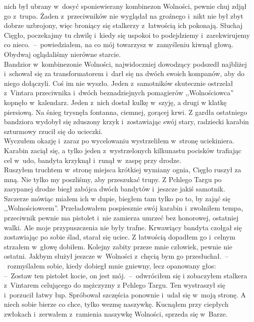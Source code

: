 \documentclass[../MAIN.tex]{subfiles}
\begin{document}
nich był ubrany w~dosyć sponiewierany kombinezon Wolności,
pewnie chuj zdjął go z~trupa. Żaden z~przeciwników nie
wyglądał na groźnego i~nikt nie był zbyt dobrze uzbrojony, więc
broniący się stalkerzy z~łatwością ich pokonają.
\sd
\xx Słuchaj Cięgło, poczekajmy tu chwilę i~kiedy się uspokoi to
podejdziemy i~zarekwirujemy co nieco.~--~powiedziałem, na co
mój towarzysz w~zamyśleniu kiwnął głową.
\qd
Obydwaj oglądaliśmy nierówne starcie.\\
Bandzior w~kombinezonie Wolności, najwidoczniej dowodzący
podszedł najbliżej i~schował się za transformatorem i~darł się
na dwóch swoich kompanów, aby do niego dołączyli. Coś im nie
wyszło. Jeden z~samotników skutecznie ostrzelał z~Vintara
przeciwnika i~dwóch beznadziejnych pomagierów ,,Wolnościowca''
kopnęło w~kalendarz. Jeden z~nich dostał kulkę w~szyję, a drugi
w klatkę piersiową. Na śnieg trysnęła fontanna, ciemnej,
gorącej krwi. Z gardła ostatniego bandziora wydobył się
zduszony krzyk i~zostawiając swój stary, radziecki karabin
szturmowy rzucił się do ucieczki.
\\
Wyczułem okazję i~zaraz po
wycelowaniu wystrzeliłem w~stronę uciekiniera. Karabin zaciął
się, a tylko jeden z~wystrzelonych kilkunastu pocisków
trafiając cel w~udo, bandyta krzyknął i~runął w~zaspę przy
drodze.
\\
Ruszyłem truchtem w~stronę miejsca krótkiej wymiany ognia,
Cięgło ruszył za mną. Nie tylko my poszliśmy, aby przeszukać
trupy. Z Pchlego Targu po zasypanej drodze biegł zabójca dwóch
bandytów i~jeszcze jakiś samotnik. Szczerze mówiąc miałem ich w
dupie, biegłem tam tylko po to, by zająć się ,,Wolnościowcem''.
Przeładowałem pospiesznie swój karabin i~zwolniłem tempa,
przeciwnik pewnie ma pistolet i~nie zamierza umrzeć bez
honorowej, ostatniej walki. Ale moje przypuszczenia nie były
trafne. Krwawiący bandyta czołgał się zostawiając po sobie
ślad, starał się uciec. Z łatwością dopadłem go i~celnym
strzałem w~głowę dobiłem. Kolejny zabity przeze mnie człowiek,
pewnie nie ostatni. Jakbym służył jeszcze w~Wolności z~chęcią
bym go przesłuchał.~--~rozmyślałem sobie, kiedy dobiegł mnie
gniewny, lecz opanowany głos:\\
--~Zostaw ten pistolet kocie, on jest mój.~--~odwróciłem się i
zobaczyłem stalkera z~Vintarem celującego do mężczyzny z
Pchlego Targu. Ten wystraszył się i~porzucił łatwy łup.
Spróbował szczęścia ponownie i~udał się w~moją stronę. A niech
sobie bierze co chce, tylko wezmę naszywkę. Kucnąłem przy
ciepłych zwłokach i~zerwałem z~ramienia naszywkę Wolności,
sprzeda się w~Barze.
\end{document}
